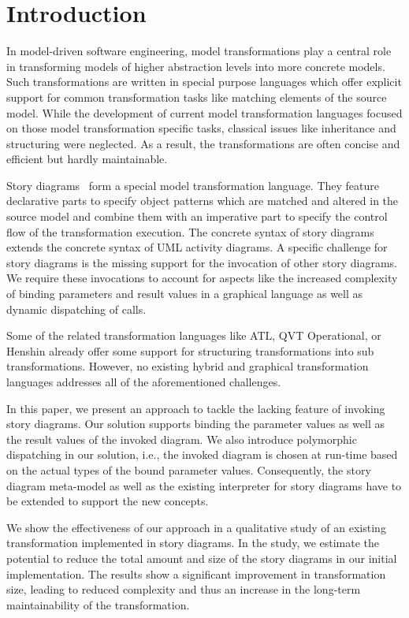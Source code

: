 \chapter{Introduction}


In model-driven software engineering, model transformations play a central role in transforming models of higher abstraction levels into more concrete models. 
Such transformations are written in special purpose languages which offer explicit support for common transformation tasks like matching elements of the source model.
While the development of current model transformation languages focused on those model transformation specific tasks, classical issues like inheritance and structuring were neglected.
As a result, the transformations are often concise and efficient but hardly maintainable.

Story diagrams~\cite{FNTZ00} form a special model transformation language.
They feature declarative parts to specify object patterns which are matched and altered in the source model and combine them with an imperative part to specify the control flow of the transformation execution.
The concrete syntax of story diagrams extends the concrete syntax of UML activity diagrams.
A specific challenge for story diagrams is the missing support for the invocation of other story diagrams.
We require these invocations to account for aspects like the increased complexity of binding parameters and result values in a graphical language as well as dynamic dispatching of calls.

Some of the related transformation languages like ATL, QVT Operational, or Henshin already offer some support for structuring transformations into sub transformations.
However, no existing hybrid and graphical transformation languages addresses all of the aforementioned challenges. 

In this paper, we present an approach to tackle the lacking feature of invoking story diagrams.
Our solution supports binding the parameter values as well as the result values of the invoked diagram.
We also introduce polymorphic dispatching in our solution, i.e., the invoked diagram is chosen at run-time based on the actual types of the bound parameter values.
Consequently, the story diagram meta-model as well as the existing interpreter for story diagrams \cite{GHS09} have to be extended to support the new concepts. 

We show the effectiveness of our approach in a qualitative study of an existing transformation implemented in story diagrams. In the study, we estimate the potential to reduce the total amount and size of the story diagrams in our initial implementation. The results show a significant improvement in transformation size, leading to reduced complexity and thus an increase in the long-term maintainability of the transformation.

